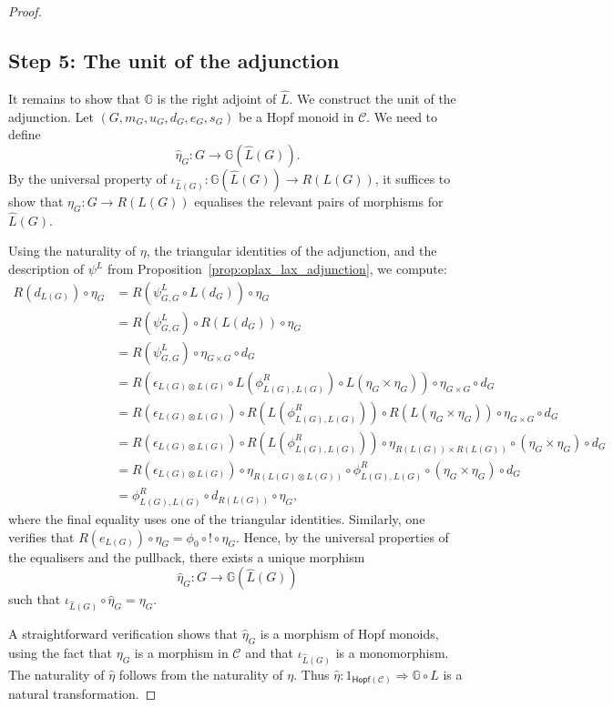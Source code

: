 \documentclass{amsart}
\begin{document}
\begin{proof}
\subsection*{Step 5: The unit of the adjunction}

It remains to show that $\mathbb{G}$ is the right adjoint of $\widehat{L}$. We construct the unit of the adjunction. Let $(G, m_G, u_G, d_G, e_G, s_G)$ be a Hopf monoid in $\mathcal{C}$. We need to define
\[
\widehat{\eta}_G \colon G \longrightarrow \mathbb{G}(\widehat{L}(G)).
\]
By the universal property of $\iota_{\widehat{L}(G)} \colon \mathbb{G}(\widehat{L}(G)) \longrightarrow R(L(G))$, it suffices to show that $\eta_G \colon G \longrightarrow R(L(G))$ equalises the relevant pairs of morphisms for $\widehat{L}(G)$.

Using the naturality of $\eta$, the triangular identities of the adjunction, and the description of $\psi^L$ from Proposition~\ref{prop:oplax_lax_adjunction}, we compute:
\begin{align*}
R(d_{L(G)}) \circ \eta_G
&= R(\psi^L_{G,G} \circ L(d_G)) \circ \eta_G \\
&= R(\psi^L_{G,G}) \circ R(L(d_G)) \circ \eta_G \\
&= R(\psi^L_{G,G}) \circ \eta_{G \times G} \circ d_G \\
&= R(\epsilon_{L(G) \otimes L(G)} \circ L(\phi^R_{L(G), L(G)}) \circ L(\eta_G \times \eta_G)) \circ \eta_{G \times G} \circ d_G \\
&= R(\epsilon_{L(G) \otimes L(G)}) \circ R(L(\phi^R_{L(G), L(G)})) \circ R(L(\eta_G \times \eta_G)) \circ \eta_{G \times G} \circ d_G \\
&= R(\epsilon_{L(G) \otimes L(G)}) \circ R(L(\phi^R_{L(G), L(G)})) \circ \eta_{R(L(G)) \times R(L(G))} \circ (\eta_G \times \eta_G) \circ d_G \\
&= R(\epsilon_{L(G) \otimes L(G)}) \circ \eta_{R(L(G) \otimes L(G))} \circ \phi^R_{L(G), L(G)} \circ (\eta_G \times \eta_G) \circ d_G \\
&= \phi^R_{L(G), L(G)} \circ d_{R(L(G))} \circ \eta_G,
\end{align*}
where the final equality uses one of the triangular identities. Similarly, one verifies that $R(e_{L(G)}) \circ \eta_G = \phi_0 \circ ! \circ \eta_G$. Hence, by the universal properties of the equalisers and the pullback, there exists a unique morphism
\[
\widehat{\eta}_G \colon G \longrightarrow \mathbb{G}(\widehat{L}(G))
\]
such that $\iota_{\widehat{L}(G)} \circ \widehat{\eta}_G = \eta_G$.

A straightforward verification shows that $\widehat{\eta}_G$ is a morphism of Hopf monoids, using the fact that $\eta_G$ is a morphism in $\mathcal{C}$ and that $\iota_{\widehat{L}(G)}$ is a monomorphism. The naturality of $\widehat{\eta}$ follows from the naturality of $\eta$. Thus $\widehat{\eta} \colon 1_{\mathsf{Hopf}(\mathcal{C})} \Rightarrow \mathbb{G} \circ \widehat{L}$ is a natural transformation.


\end{proof}
\end{document}

